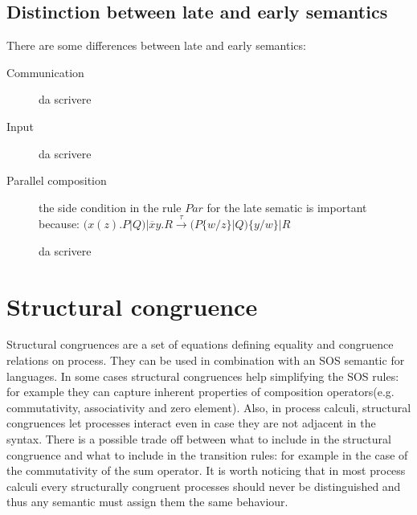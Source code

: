 


\subsection{Distinction between late and early semantics}

There are some differences between late and early semantics:
\begin{description}
  \item[Communication]
    da scrivere
  \item[Input]
    da scrivere
  \item[Parallel composition]
    the side condition in the rule $Par$ for the late sematic is important because:
    $(x(z).P|Q)|\overline{x}y.R \xrightarrow{\tau} (P\{w/z\}|Q)\{y/w\}|R$ 
    
    da scrivere
\end{description}




\section{Structural congruence}

Structural congruences are a set of equations defining equality and congruence relations on process. They can be used in combination with an SOS semantic for languages. In some cases structural congruences help simplifying the SOS rules: for example they can capture inherent properties of composition operators(e.g. commutativity, associativity and zero element). Also, in process calculi, structural congruences let processes interact even in case they are not adjacent in the syntax. There is a possible trade off between what to include in the structural congruence and what to include in the transition rules: for example in the case of the commutativity of the sum operator. It is worth noticing that in most process calculi every structurally congruent processes should never be distinguished and thus any semantic must assign them the same behaviour.


